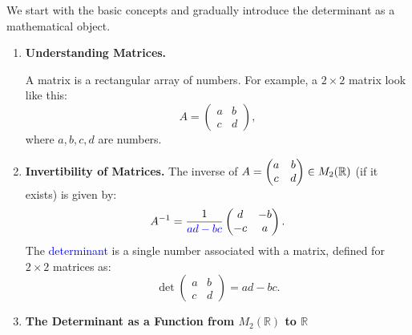 \documentclass[11pt,openany]{article}
\begin{document}
\begin{example}[Determinant]
We start with the basic concepts and gradually introduce the determinant as a mathematical object.
\begin{enumerate}
	\item \textbf{\large Understanding Matrices.} 
	
	A matrix is a rectangular array of numbers. For example, a $2\times 2$ matrix look like this:\[
	A=\begin{pmatrix}
		a & b \\ c & d
	\end{pmatrix},
	\] where $a,b,c,d$ are numbers.
	\item \textbf{\large Invertibility of Matrices.} The inverse of 
	$A=\begin{pmatrix}a & b \\ c & d\end{pmatrix}\in M_2(\mathbb{R})$ (if it exists) is given by: \[
	A^{-1}=\frac{1}{\textcolor{blue}{ad-bc}}\begin{pmatrix}
		d & -b \\ -c & a
	\end{pmatrix}.
	\] The \textcolor{blue}{determinant} is a single number associated with a matrix, defined for $2\times 2$ matrices as: \[
	\det\begin{pmatrix}
		a & b \\ c & d
	\end{pmatrix}=ad-bc.
	\]
	\item \textbf{\large The Determinant as a Function from $M_2(\mathbb{R})$ to $\mathbb{R}$}
	

\end{enumerate}
\end{example}
\end{document}
